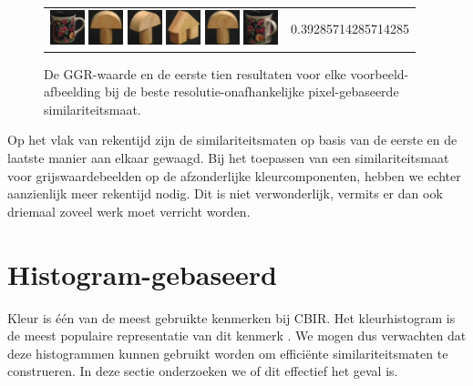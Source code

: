 \begin{figure}[tbp]
\begin{center}
\begin{tabular}{m{11cm} | m{3cm} |}
\includegraphics[width=1cm]{coil/beeld-60.eps}
\includegraphics[width=1cm]{coil/beeld-1.eps}
\includegraphics[width=1cm]{coil/beeld-3.eps}
\includegraphics[width=1cm]{coil/beeld-45.eps}
\includegraphics[width=1cm]{coil/beeld-0.eps}
\includegraphics[width=1cm]{coil/beeld-64.eps}
& {\scriptsize 0.39285714285714285}
\end{tabular}
\caption{\label{fig:results_beste_pixelgeb}De GGR-waarde en de eerste tien resultaten voor elke voorbeeld-afbeelding bij de beste resolutie-onafhankelijke pixel-gebaseerde similariteitsmaat.}
\end{center}
\end{figure}

Op het vlak van rekentijd zijn de similariteitsmaten op basis van de eerste en de laatste manier
aan elkaar gewaagd. Bij het toepassen van een similariteitsmaat voor grijswaardebeelden op de 
afzonderlijke kleurcomponenten, hebben we echter aanzienlijk meer rekentijd nodig. Dit is niet
verwonderlijk, vermits er dan ook driemaal zoveel werk moet verricht worden.


\section{Histogram-gebaseerd}

Kleur is \'e\'en van de meest gebruikte kenmerken bij CBIR. Het kleurhistogram is de meest 
populaire representatie van dit kenmerk \cite{rui:image_retr}. We mogen dus verwachten
dat deze histogrammen kunnen gebruikt worden om effici\"ente similariteitsmaten te construeren.
In deze sectie onderzoeken we of dit effectief het geval is. 

